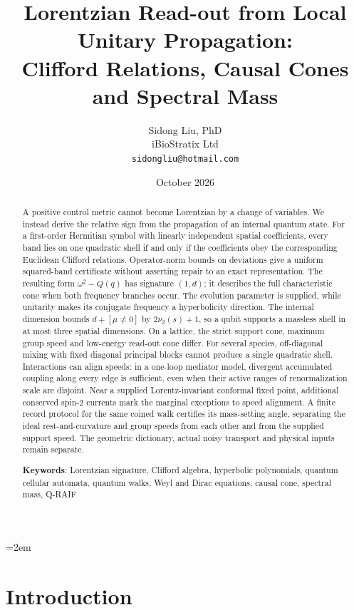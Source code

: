\documentclass[12pt]{article}
\title{Lorentzian Read-out from Local Unitary Propagation:\\
Clifford Relations, Causal Cones and Spectral Mass}
\author{Sidong Liu, PhD \\
\small iBioStratix Ltd \\
\small \texttt{sidongliu@hotmail.com}}
\date{October 2026}
\theoremstyle{definition}
\theoremstyle{remark}
\begin{document}
\emergencystretch=2em
\raggedbottom
\maketitle

\begin{abstract}
A positive control metric cannot become Lorentzian by a change of variables. We instead derive the relative sign from the propagation of an internal quantum state. For a first-order Hermitian symbol with linearly independent spatial coefficients, every band lies on one quadratic shell if and only if the coefficients obey the corresponding Euclidean Clifford relations. Operator-norm bounds on deviations give a uniform squared-band certificate without asserting repair to an exact representation. The resulting form $\omega^2-Q(q)$ has signature $(1,d)$; it describes the full characteristic cone when both frequency branches occur. The evolution parameter is supplied, while unitarity makes its conjugate frequency a hyperbolicity direction. The internal dimension bounds $d+[\mu\neq0]$ by $2\nu_2(s)+1$, so a qubit supports a massless shell in at most three spatial dimensions. On a lattice, the strict support cone, maximum group speed and low-energy read-out cone differ. For several species, off-diagonal mixing with fixed diagonal principal blocks cannot produce a single quadratic shell. Interactions can align speeds: in a one-loop mediator model, divergent accumulated coupling along every edge is sufficient, even when their active ranges of renormalization scale are disjoint. Near a supplied Lorentz-invariant conformal fixed point, additional conserved spin-2 currents mark the marginal exceptions to speed alignment. A finite record protocol for the same coined walk certifies its mass-setting angle, separating the ideal rest-and-curvature and group speeds from each other and from the supplied support speed. The geometric dictionary, actual noisy transport and physical inputs remain separate.

\medskip
\noindent\textbf{Keywords}: Lorentzian signature, Clifford algebra, hyperbolic polynomials, quantum cellular automata, quantum walks, Weyl and Dirac equations, causal cone, spectral mass, Q-RAIF
\end{abstract}

\section{Introduction}
\label{sec:intro}
\end{document}
